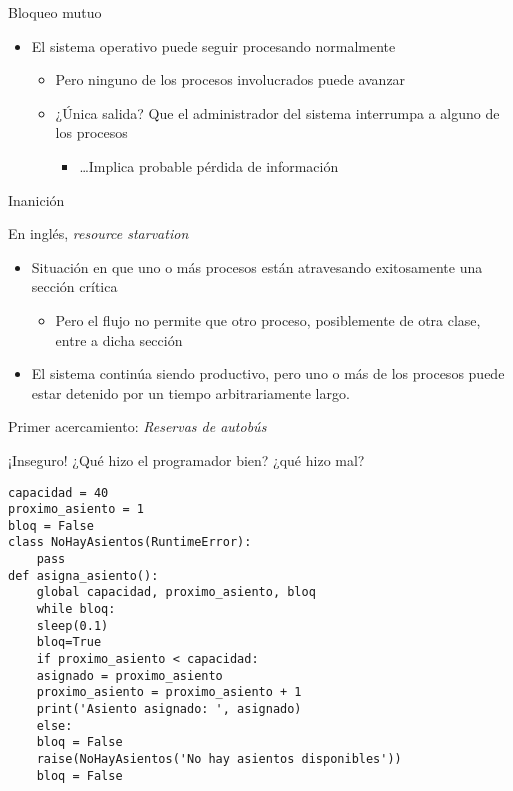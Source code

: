 \documentclass[presentation]{beamer}
\begin{document}
\begin{frame}[label={sec:org5d5a93b}]{Bloqueo mutuo}
\begin{itemize}
\item El sistema operativo puede seguir procesando normalmente
\begin{itemize}
\item Pero ninguno de los procesos involucrados puede avanzar
\item ¿Única salida? Que el administrador del sistema interrumpa a
alguno de los procesos
\begin{itemize}
\item \ldots{}Implica probable pérdida de información
\end{itemize}
\end{itemize}
\end{itemize}
\end{frame}

\begin{frame}[label={sec:orgae0cc03}]{Inanición}
\begin{center}
En inglés, \emph{resource starvation}
\end{center}
\begin{itemize}
\item Situación en que uno o más procesos están atravesando exitosamente
una sección crítica
\begin{itemize}
\item Pero el flujo no permite que otro proceso, posiblemente de otra
clase, entre a dicha sección
\end{itemize}
\item El sistema continúa siendo productivo, pero uno o más de los procesos
puede estar detenido por un tiempo arbitrariamente largo.
\end{itemize}
\end{frame}

\begin{frame}[label={sec:org4c67166},fragile]{Primer acercamiento: \emph{Reservas de autobús}}
 \begin{center}
¡Inseguro! ¿Qué hizo el programador bien? ¿qué hizo mal?
\end{center}
\begin{verbatim}
capacidad = 40
proximo_asiento = 1
bloq = False
class NoHayAsientos(RuntimeError):
    pass
def asigna_asiento():
    global capacidad, proximo_asiento, bloq
    while bloq:
	sleep(0.1)
    bloq=True
    if proximo_asiento < capacidad:
	asignado = proximo_asiento
	proximo_asiento = proximo_asiento + 1
	print('Asiento asignado: ', asignado)
    else:
	bloq = False
	raise(NoHayAsientos('No hay asientos disponibles'))
    bloq = False
\end{verbatim}
\end{frame}
\end{document}
